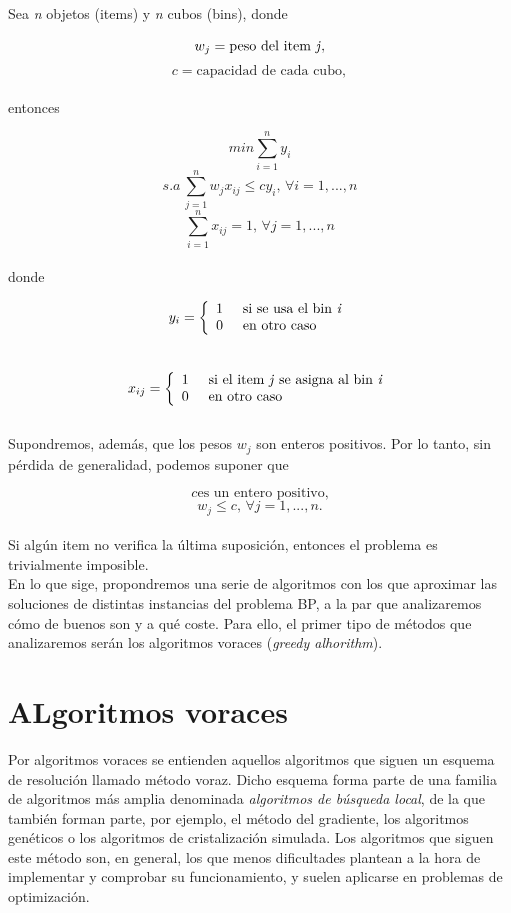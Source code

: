 \documentclass[a4paper, 12pt, oneside]{book}
\begin{document}
	Sea \textit{n} objetos (items) y \textit{n} cubos (bins), donde
	
	$$w_{j} = \mbox{peso del item \textit{j}},$$
	$$c = \mbox{capacidad de cada cubo},$$
	\\
	entonces 
	
	$$ min \sum_{i=1}^{n}y_{i} $$
	$$ s.a\, \sum_{j=1}^{n}w_{j}x_{ij} \leq cy_{i},\, \forall i=1,...,n $$
	$$ \sum_{i=1}^{n}x_{ij} = 1,\, \forall j=1,...,n $$
	\\
	donde
	
	\[y_{i} = \left\{\begin{array}{ll}
		1 \hspace{0.5cm} \text{si se usa el bin \textit{i}}\\
		0 \hspace{0.5cm} \text{en otro caso}
	\end{array}\right.\]
	\\
	\[x_{ij} = \left\{\begin{array}{ll}
		1 \hspace{0.5cm} \text{si el item \textit{j} se asigna al bin \textit{i}}\\
		0 \hspace{0.5cm} \text{en otro caso}
	\end{array}\right.\]
	\\
	Supondremos, adem\'as, que los pesos $w_{j}$ son enteros positivos. Por lo tanto, sin p\'erdida de generalidad, podemos suponer que
	
	$$ c \mbox{es un entero positivo,} $$
	$$ w_{j} \leq c,\, \forall j = 1,...,n. $$
	\\
	Si alg\'un item no verifica la \'ultima suposici\'on, entonces el problema es trivialmente imposible.
	\\
	
	En lo que sige, propondremos una serie de algoritmos con los que aproximar las soluciones de distintas instancias del problema BP, a la par que analizaremos c\'omo de buenos son y a qu\'e coste. Para ello, el primer tipo de m\'etodos que analizaremos ser\'an los algoritmos voraces (\textit{greedy alhorithm}).
	
	\section{ALgoritmos voraces}
	Por algoritmos voraces se entienden aquellos algoritmos que siguen un esquema de resoluci\'on llamado m\'etodo voraz. Dicho esquema forma parte de una familia de algoritmos m\'as amplia denominada \textit{algoritmos de b\'usqueda local}, de la que tambi\'en forman parte, por ejemplo, el m\'etodo del gradiente, los algoritmos gen\'eticos o los algoritmos de cristalizaci\'on simulada. Los algoritmos que siguen este m\'etodo son, en general, los que menos dificultades plantean a la hora de implementar y comprobar su funcionamiento, y suelen aplicarse en problemas de optimizaci\'on.
	\\
	
\end{document}
